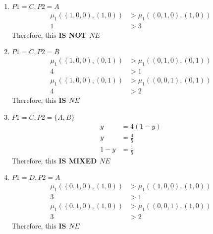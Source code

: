 \documentclass[12pt, a4paper]{article}
\begin{document}
\begin{enumerate}
  \item $P1 = C, P2 = A$\\
 \begin{subequations}
  \begin{align}
    \mu_1((1,0,0),(1,0)) &> \mu_1((0,1,0),(1,0))\\
    1 &> 3
  \end{align}
\end{subequations}
Therefore, this \textbf{IS NOT $NE$}

  \item $P1 = C, P2 = B$\\
 \begin{subequations}
  \begin{align}
    \mu_1((1,0,0),(0,1)) &> \mu_1((0,1,0),(0,1))\\
    4 &> 1
  \end{align}
\end{subequations}
 \begin{subequations}
  \begin{align}
    \mu_1((1,0,0),(0,1)) &> \mu_1((0,0,1),(0,1))\\
    4 &> 2
  \end{align}
\end{subequations}
Therefore, this \textbf{IS $NE$}


\item $P1 = C, P2 = \{A,B\}$\\
 \begin{subequations}
  \begin{align}
    y &= 4(1-y)\\
     y &= \frac{4}{5}\\
    1-y &= \frac{1}{5}
  \end{align}
\end{subequations}
Therefore, this \textbf{IS MIXED $NE$}

\item $P1 = D, P2 = A$\\
 \begin{subequations}
  \begin{align}
    \mu_1((0,1,0),(1,0)) &> \mu_1((1,0,0),(1,0))\\
    3 &> 1
  \end{align}
\end{subequations}
 \begin{subequations}
  \begin{align}
    \mu_1((0,1,0),(1,0)) &> \mu_1((0,0,1),(1,0))\\
    3 &> 2
  \end{align}
\end{subequations}
Therefore, this \textbf{IS $NE$}


\end{enumerate}
\end{document}
